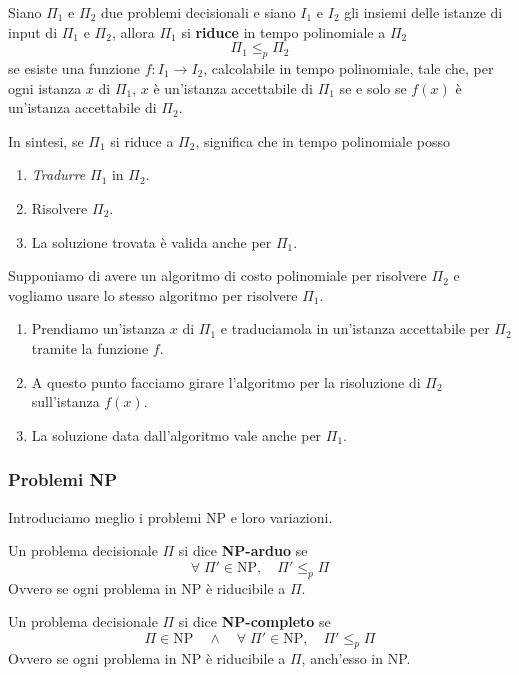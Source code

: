 \begin{theorem}
	Siano $\Pi_1$ e $\Pi_2$ due problemi decisionali e siano $I_1$ e $I_2$ gli insiemi delle istanze di input di
	$\Pi_1$ e $\Pi_2$, allora $\Pi_1$ si \textbf{riduce} in tempo polinomiale a $\Pi_2$
	\[ \Pi_1 \leq_p \Pi_2 \]
	se esiste una funzione $f : I_1 \rightarrow I_2$, calcolabile in tempo polinomiale, tale che, per ogni istanza $x$
	di $\Pi_1$, $x$ \`e un'istanza accettabile di $\Pi_1$ se e solo se $f(x)$ \`e un'istanza accettabile di $\Pi_2$.
\end{theorem}

In sintesi, se $\Pi_1$ si riduce a $\Pi_2$, significa che in tempo polinomiale posso
\begin{enumerate}
	\item \emph{Tradurre} $\Pi_1$ in $\Pi_2$.
	\item Risolvere $\Pi_2$.
	\item La soluzione trovata \`e valida anche per $\Pi_1$.
\end{enumerate}

Supponiamo di avere un algoritmo di costo polinomiale per risolvere $\Pi_2$ e vogliamo usare lo stesso algoritmo per
risolvere $\Pi_1$.
\begin{enumerate}
	\item Prendiamo un'istanza $x$ di $\Pi_1$ e traduciamola in un'istanza accettabile per $\Pi_2$ tramite la funzione
	      $f$.
	\item A questo punto facciamo girare l'algoritmo per la risoluzione di $\Pi_2$ sull'istanza $f(x)$.
	\item La soluzione data dall'algoritmo vale anche per $\Pi_1$.
\end{enumerate}

\subsubsection{Problemi NP}

Introduciamo meglio i problemi NP e loro variazioni.

\begin{definition}
	Un problema decisionale $\Pi$ si dice \textbf{NP-arduo} se
	\[	\forall \; \Pi' \in \text{NP}, \quad \Pi' \leq_p \Pi \]
	Ovvero se ogni problema in NP \`e riducibile a $\Pi$.
\end{definition}

\begin{definition}
	Un problema decisionale $\Pi$ si dice \textbf{NP-completo} se
	\[ \Pi \in \text{NP} \quad \wedge \quad \forall \; \Pi' \in \text{NP}, \quad \Pi' \leq_p \Pi \]
	Ovvero se ogni problema in NP \`e riducibile a $\Pi$, anch'esso in NP.
\end{definition}

